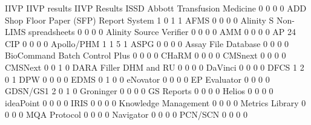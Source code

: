 \documentclass{article}
\begin{document}
\begin{Schunk}
\begin{Soutput}
                                           IIVP IIVP results IIVP Results ISSD
  Abbott Transfusion Medicine                 0            0            0    0
  ADD Shop Floor Paper (SFP) Report System    1            0            1    1
  AFMS                                        0            0            0    0
  Alinity S Non-LIMS spreadsheets             0            0            0    0
  Alinity Source Verifier                     0            0            0    0
  AMM                                         0            0            0    0
  AP 24 CIP                                   0            0            0    0
  Apollo/PHM                                  1            1            5    1
  ASPG                                        0            0            0    0
  Assay File Database                         0            0            0    0
  BioCommand Batch Control Plus               0            0            0    0
  CHaRM                                       0            0            0    0
  CMSnext                                     0            0            0    0
  CMSNext                                     0            0            1    0
  DARA Filler DHM and RU                      0            0            0    0
  DaVinci                                     0            0            0    0
  DFCS                                        1            2            0    1
  DPW                                         0            0            0    0
  EDMS                                        0            1            0    0
  eNovator                                    0            0            0    0
  EP Evaluator                                0            0            0    0
  GDSN/GS1                                    2            0            1    0
  Groninger                                   0            0            0    0
  GS Reports                                  0            0            0    0
  Helios                                      0            0            0    0
  ideaPoint                                   0            0            0    0
  IRIS                                        0            0            0    0
  Knowledge Management                        0            0            0    0
  Metrics Library                             0            0            0    0
  MQA Protocol                                0            0            0    0
  Navigator                                   0            0            0    0
  PCN/SCN                                     0            0            0    0

\end{Soutput}
\end{Schunk}
\end{document}
